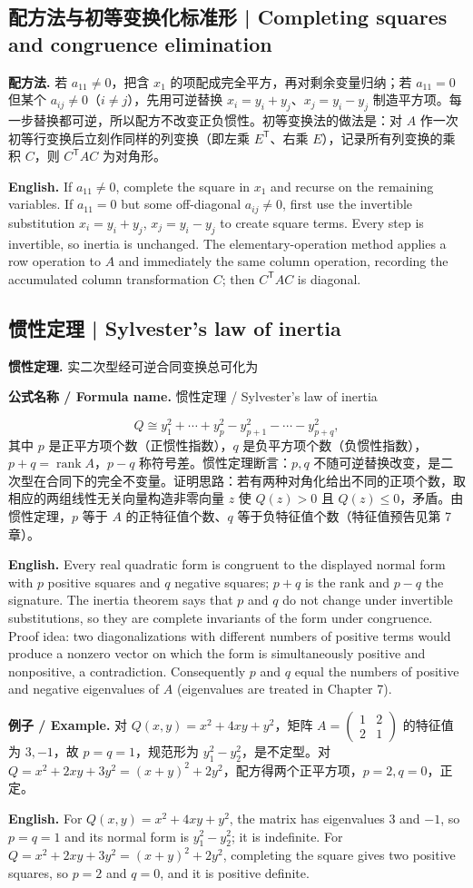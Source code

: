 \documentclass[UTF8,11pt,a4paper]{ctexart}
\newcommand{\EN}[1]{\par\noindent\textbf{English.} #1\par}
\newcommand{\FORMULA}[2]{\par\noindent\textbf{公式名称 / Formula name.} #1 / #2\par}
\newcommand{\EX}[2]{\par\noindent\textbf{例子 / Example.} #1\par\EN{#2}}
\begin{document}
\subsection{配方法与初等变换化标准形 | Completing squares and congruence elimination}
\noindent\textbf{配方法.} 若 $a_{11}\ne0$，把含 $x_1$ 的项配成完全平方，再对剩余变量归纳；若 $a_{11}=0$ 但某个 $a_{ij}\ne0$（$i\ne j$），先用可逆替换 $x_i=y_i+y_j$、$x_j=y_i-y_j$ 制造平方项。每一步替换都可逆，所以配方不改变正负惯性。初等变换法的做法是：对 $A$ 作一次初等行变换后立刻作同样的列变换（即左乘 $E^{\mathsf T}$、右乘 $E$），记录所有列变换的乘积 $C$，则 $C^{\mathsf T}AC$ 为对角形。
\EN{If $a_{11}\ne0$, complete the square in $x_1$ and recurse on the remaining variables. If $a_{11}=0$ but some off-diagonal $a_{ij}\ne0$, first use the invertible substitution $x_i=y_i+y_j$, $x_j=y_i-y_j$ to create square terms. Every step is invertible, so inertia is unchanged. The elementary-operation method applies a row operation to $A$ and immediately the same column operation, recording the accumulated column transformation $C$; then $C^{\mathsf T}AC$ is diagonal.}

\subsection{惯性定理 | Sylvester's law of inertia}
\noindent\textbf{惯性定理.} 实二次型经可逆合同变换总可化为
\FORMULA{惯性定理}{Sylvester's law of inertia}
\[
Q\cong y_1^2+\cdots+y_p^2-y_{p+1}^2-\cdots-y_{p+q}^2,
\]
其中 $p$ 是正平方项个数（正惯性指数），$q$ 是负平方项个数（负惯性指数），$p+q=\operatorname{rank}A$，$p-q$ 称符号差。惯性定理断言：$p,q$ 不随可逆替换改变，是二次型在合同下的完全不变量。证明思路：若有两种对角化给出不同的正项个数，取相应的两组线性无关向量构造非零向量 $z$ 使 $Q(z)>0$ 且 $Q(z)\le0$，矛盾。由惯性定理，$p$ 等于 $A$ 的正特征值个数、$q$ 等于负特征值个数（特征值预告见第 7 章）。
\EN{Every real quadratic form is congruent to the displayed normal form with $p$ positive squares and $q$ negative squares; $p+q$ is the rank and $p-q$ the signature. The inertia theorem says that $p$ and $q$ do not change under invertible substitutions, so they are complete invariants of the form under congruence. Proof idea: two diagonalizations with different numbers of positive terms would produce a nonzero vector on which the form is simultaneously positive and nonpositive, a contradiction. Consequently $p$ and $q$ equal the numbers of positive and negative eigenvalues of $A$ (eigenvalues are treated in Chapter 7).}
\EX{对 $Q(x,y)=x^2+4xy+y^2$，矩阵 $A=\begin{pmatrix}1&2\\2&1\end{pmatrix}$ 的特征值为 $3,-1$，故 $p=q=1$，规范形为 $y_1^2-y_2^2$，是不定型。对 $Q=x^2+2xy+3y^2=(x+y)^2+2y^2$，配方得两个正平方项，$p=2,q=0$，正定。}{For $Q(x,y)=x^2+4xy+y^2$, the matrix has eigenvalues $3$ and $-1$, so $p=q=1$ and its normal form is $y_1^2-y_2^2$; it is indefinite. For $Q=x^2+2xy+3y^2=(x+y)^2+2y^2$, completing the square gives two positive squares, so $p=2$ and $q=0$, and it is positive definite.}
\end{document}
